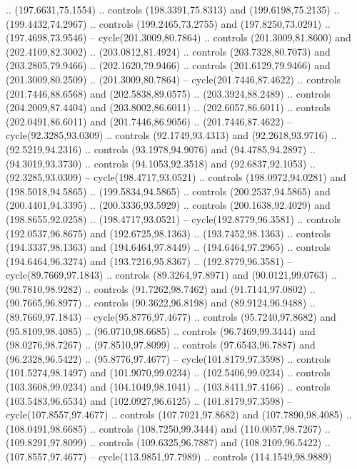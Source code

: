 \begin{scope}[cm={{1.25,0.0,0.0,-1.25,(0.0,442.91375)}}]
    .. (197.6631,75.1554) .. controls (198.3391,75.8313) and (199.6198,75.2135) ..
    (199.4432,74.2967) .. controls (199.2465,73.2755) and (197.8250,73.0291) ..
    (197.4698,73.9546) -- cycle(201.3009,80.7864) .. controls (201.3009,81.8600)
    and (202.4109,82.3002) .. (203.0812,81.4924) .. controls (203.7328,80.7073)
    and (203.2805,79.9466) .. (202.1620,79.9466) .. controls (201.6129,79.9466)
    and (201.3009,80.2509) .. (201.3009,80.7864) -- cycle(201.7446,87.4622) ..
    controls (201.7446,88.6568) and (202.5838,89.0575) .. (203.3924,88.2489) ..
    controls (204.2009,87.4404) and (203.8002,86.6011) .. (202.6057,86.6011) ..
    controls (202.0491,86.6011) and (201.7446,86.9056) .. (201.7446,87.4622) --
    cycle(92.3285,93.0309) .. controls (92.1749,93.4313) and (92.2618,93.9716) ..
    (92.5219,94.2316) .. controls (93.1978,94.9076) and (94.4785,94.2897) ..
    (94.3019,93.3730) .. controls (94.1053,92.3518) and (92.6837,92.1053) ..
    (92.3285,93.0309) -- cycle(198.4717,93.0521) .. controls (198.0972,94.0281)
    and (198.5018,94.5865) .. (199.5834,94.5865) .. controls (200.2537,94.5865)
    and (200.4401,94.3395) .. (200.3336,93.5929) .. controls (200.1638,92.4029)
    and (198.8655,92.0258) .. (198.4717,93.0521) -- cycle(192.8779,96.3581) ..
    controls (192.0537,96.8675) and (192.6725,98.1363) .. (193.7452,98.1363) ..
    controls (194.3337,98.1363) and (194.6464,97.8449) .. (194.6464,97.2965) ..
    controls (194.6464,96.3274) and (193.7216,95.8367) .. (192.8779,96.3581) --
    cycle(89.7669,97.1843) .. controls (89.3264,97.8971) and (90.0121,99.0763) ..
    (90.7810,98.9282) .. controls (91.7262,98.7462) and (91.7144,97.0802) ..
    (90.7665,96.8977) .. controls (90.3622,96.8198) and (89.9124,96.9488) ..
    (89.7669,97.1843) -- cycle(95.8776,97.4677) .. controls (95.7240,97.8682) and
    (95.8109,98.4085) .. (96.0710,98.6685) .. controls (96.7469,99.3444) and
    (98.0276,98.7267) .. (97.8510,97.8099) .. controls (97.6543,96.7887) and
    (96.2328,96.5422) .. (95.8776,97.4677) -- cycle(101.8179,97.3598) .. controls
    (101.5274,98.1497) and (101.9070,99.0234) .. (102.5406,99.0234) .. controls
    (103.3608,99.0234) and (104.1049,98.1041) .. (103.8411,97.4166) .. controls
    (103.5483,96.6534) and (102.0927,96.6125) .. (101.8179,97.3598) --
    cycle(107.8557,97.4677) .. controls (107.7021,97.8682) and (107.7890,98.4085)
    .. (108.0491,98.6685) .. controls (108.7250,99.3444) and (110.0057,98.7267) ..
    (109.8291,97.8099) .. controls (109.6325,96.7887) and (108.2109,96.5422) ..
    (107.8557,97.4677) -- cycle(113.9851,97.7989) .. controls (114.1549,98.9889)

\end{scope}
